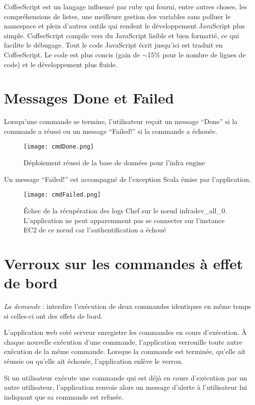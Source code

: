 CoffeeScript est un langage influencé par ruby qui fourni, entre autres choses,
les compréhensions de listes, une meilleure gestion des variables sans polluer
le namespace et plein d'autres outils qui rendent le développement JavaScript
plus simple. CoffeeScript compile vers du JavaScript lisible et bien formatté,
ce qui facilite le débugage.
Tout le code JavaScript écrit jusqu'ici est traduit en CoffeeScript.
Le code est plus concis (gain de $\sim$15\% pour le nombre de lignes de code) et le
développement plus fluide.

\section{Messages Done et Failed}

Lorsqu'une commande se termine, l'utilisateur reçoit un message ``Done'' si la
commande a réussi ou un message ``Failed!'' si la commande a échouée.

\begin{figure}[H]
  \texttt{[image: cmdDone.png]}
  \caption{Déploiement réussi de la base de données pour l'infra engine}
\end{figure}

Un message ``Failed!'' est accompagné de l'exception Scala émise par
l'application.

\begin{figure}[H]
  \texttt{[image: cmdFailed.png]}
  \caption{Échec de la récupération des logs Chef sur le nœud infradev\_all\_0.\\
    L'application ne peut apparemment pas se connecter sur l'instance EC2 de
    ce nœud car l'authentification a échoué}
\end{figure}

\section{Verroux sur les commandes à effet de bord}

\textit{La demande} : interdire l'exécution de deux commandes identiques en même temps si
celles-ci ont des effets de bord.

L'application web coté serveur enregistre les commandes en cours d'exécution.
À chaque nouvelle exécution d'une commande, l'application verrouille toute autre
exécution de la même commande. Lorsque la commande est terminée, qu'elle ait
réussie ou qu'elle ait échouée, l'application enlève le verrou.

Si un utilisateur exécute une commande qui est déjà en cours d'exécution par un
autre utilisateur, l'application renvoie alors un message d'alerte à
l'utilisateur lui indiquant que sa commande est refusée.

